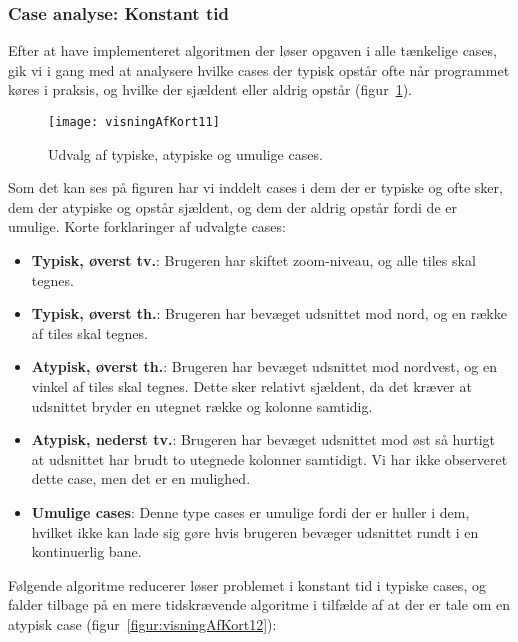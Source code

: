 \subsubsection{Case analyse: Konstant tid}
\label{subsec:caseAnalyse}

Efter at have implementeret algoritmen der løser opgaven i alle tænkelige cases, gik vi i gang med at analysere hvilke cases der typisk opstår ofte når programmet køres i praksis, og hvilke der sjældent eller aldrig opstår (figur~\ref{figur:visningAfKort11}).

\begin{figure}[h]
	\centering
	\texttt{[image: visningAfKort11]}
	\captionsetup{width=0.8\textwidth}
	\caption{Udvalg af typiske, atypiske og umulige cases.}
	\label{figur:visningAfKort11}
\end{figure}

Som det kan ses på figuren har vi inddelt cases i dem der er typiske og ofte sker, dem der atypiske og opstår sjældent, og dem der aldrig opstår fordi de er umulige. Korte forklaringer af udvalgte cases:

\begin{itemize}
	\item \textbf{Typisk, øverst tv.}: Brugeren har skiftet zoom-niveau, og alle tiles skal tegnes.
	\item \textbf{Typisk, øverst th.}: Brugeren har bevæget udsnittet mod nord, og en række af tiles skal tegnes.
	\item \textbf{Atypisk, øverst th.}: Brugeren har bevæget udsnittet mod nordvest, og en vinkel af tiles skal tegnes. Dette sker relativt sjældent, da det kræver at udsnittet bryder en utegnet række og kolonne samtidig.
	\item \textbf{Atypisk, nederst tv.}: Brugeren har bevæget udsnittet mod øst så hurtigt at udsnittet har brudt to utegnede kolonner samtidigt. Vi har ikke observeret dette case, men det er en mulighed.
	\item \textbf{Umulige cases}: Denne type cases er umulige fordi der er huller i dem, hvilket ikke kan lade sig gøre hvis brugeren bevæger udsnittet rundt i en kontinuerlig bane.
\end{itemize}

Følgende algoritme reducerer løser problemet i konstant tid i typiske cases, og falder tilbage på en mere tidskrævende algoritme i tilfælde af at der er tale om en atypisk case (figur~\ref{figur:visningAfKort12}):

